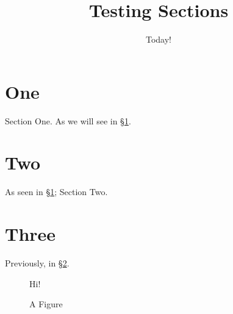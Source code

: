\documentclass{article}
\title{Testing Sections}
\date{Today!}
\begin{document}
\maketitle
\section{One}\label{sec:one}
Section One. As we will see in \S\ref{fig_three}.
\section{Two}\label{sec:two}
As seen in \S\ref{sec:one}; Section Two.
\section{Three}\label{sec:three}
Previously, in \S\ref{sec:two}.
\begin{figure}
Hi!
\caption{A Figure\label{fig_three}}
\end{figure}
\end{document}

